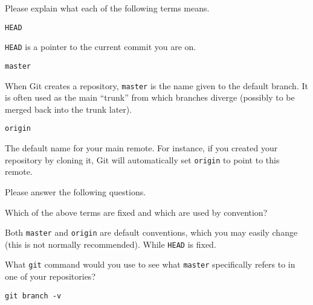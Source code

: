 \documentclass[10pt]{examdesign}
\begin{document}
\begin{shortanswer}[title={Short Answer},
                    rearrange=no,resetcounter=no]

\begin{block}[questions=3]
Please explain what each of the following terms means.

\begin{question}
  \texttt{HEAD}
  \vspace{5mm}
  \begin{answer}
    \texttt{HEAD} is a pointer to the current commit you are on.
  \end{answer}
\end{question}

\begin{question}
  \texttt{master}
  \vspace{5mm}
  \begin{answer}
    When Git creates a repository, \texttt{master} is the name given
    to the default branch.  It is often used as the main ``trunk'' from
    which branches diverge (possibly to be merged back into the
    trunk later).
  \end{answer}
\end{question}

\begin{question}
  \texttt{origin}
  \vspace{5mm}
  \begin{answer}
    The default name for your main remote.  For instance, if you created
    your repository by cloning it, Git will automatically set \texttt{origin}
    to point to this remote.
  \end{answer}
\end{question}
\end{block}

\begin{block}[questions=3]
Please answer the following questions.

\begin{question}
  Which of the above terms are fixed and which are used by convention?
  \vspace{5mm}
  \begin{answer}
    Both \texttt{master} and \texttt{origin} are default conventions, which
    you may easily change (this is not normally recommended).  While
    \texttt{HEAD} is fixed.
  \end{answer}
\end{question}

\begin{question}
  What \texttt{git} command would you use to see what \texttt{master}
  specifically refers to in one of your repositories?
  \vspace{5mm}
  \begin{answer}
    \texttt{git branch -v}
  \end{answer}
\end{question}


\end{block}
\end{shortanswer}
\end{document}
